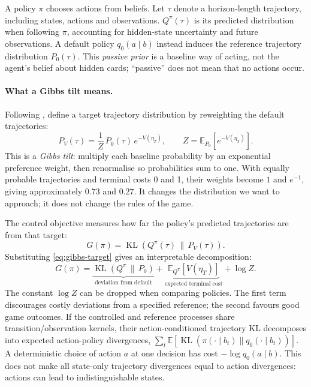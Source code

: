 \documentclass[11pt,a4paper]{article}
\theoremstyle{definition}
\theoremstyle{plain}
\DeclareMathOperator{\KL}{KL}
\begin{document}
A policy $\pi$ chooses actions from beliefs. Let $\tau$ denote a horizon-length trajectory, including states, actions and observations. $Q^\pi(\tau)$ is its predicted distribution when following $\pi$, accounting for hidden-state uncertainty and future observations. A default policy $q_0(a\mid b)$ instead induces the reference trajectory distribution $P_0(\tau)$. This \emph{passive prior} is a baseline way of acting, not the agent's belief about hidden cards; ``passive'' does not mean that no actions occur.

\paragraph{What a Gibbs tilt means.} Following \citet{kaufmann2026aifcontrol}, define a target trajectory distribution by reweighting the default trajectories:
\begin{equation}
P_V(\tau)=\frac{1}{Z}\,P_0(\tau)\,e^{-V(\eta_T)},\qquad
Z=\mathbb E_{P_0}\!\left[e^{-V(\eta_T)}\right].
\label{eq:gibbs-target}
\end{equation}
This is a \emph{Gibbs tilt}: multiply each baseline probability by an exponential preference weight, then renormalise so probabilities sum to one. With equally probable trajectories and terminal costs 0 and 1, their weights become $1$ and $e^{-1}$, giving approximately $0.73$ and $0.27$. It changes the distribution we want to approach; it does not change the rules of the game.

The control objective measures how far the policy's predicted trajectories are from that target:
\begin{equation}
G(\pi)=\KL\!\left(Q^\pi(\tau)\,\|\,P_V(\tau)\right).
\label{eq:pathefe}
\end{equation}
Substituting \eqref{eq:gibbs-target} gives an interpretable decomposition:
\begin{equation}
G(\pi)=
 \underbrace{\KL\!\left(Q^\pi\,\|\,P_0\right)}_{\text{deviation from default}}
 +\underbrace{\mathbb E_{Q^\pi}[V(\eta_T)]}_{\text{expected terminal cost}}
 +\log Z.
\label{eq:klcontrol}
\end{equation}
The constant $\log Z$ can be dropped when comparing policies. The first term discourages costly deviations from a specified reference; the second favours good game outcomes. If the controlled and reference processes share transition/observation kernels, their action-conditioned trajectory KL decomposes into expected action-policy divergences, $\sum_t\mathbb E[\KL(\pi(\cdot\mid b_t)\|q_0(\cdot\mid b_t))]$. A deterministic choice of action $a$ at one decision has cost $-\log q_0(a\mid b)$. This does not make all state-only trajectory divergences equal to action divergences: actions can lead to indistinguishable states.
\end{document}
